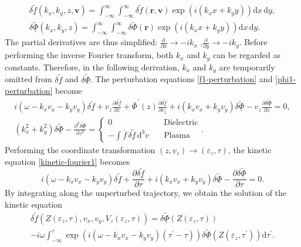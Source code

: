 \documentclass[superscriptaddress,preprint]{revtex4}  %
\renewcommand{\vec}{\mathbf}
\begin{document}
\begin{gather}
\delta\!\underline{\tilde{f}}(k_x,k_y,z,\vec{v})=\int_{-\infty}^{\infty} \int_{-\infty}^{\infty} \delta\!\tilde{f} (\vec{r},\vec{v}) \exp\left(i \left( k_x x+k_y y \right)\right) \mathrm{d}x \,\mathrm{d}y,\\
\delta \underline{\tilde{\Phi}}(k_x,k_y,z)=\int_{-\infty}^{\infty} \int_{-\infty}^{\infty} \delta\tilde{\Phi}(\vec{r}) \exp\left(i \left( k_x x+k_y y \right)\right) \mathrm{d}x \,\mathrm{d}y.
\end{gather}
The partial derivatives are thus simplified: $\displaystyle{\frac{\partial\,}{\partial x} \rightarrow -i k_x}$ ,$\displaystyle{\frac{\partial\,}{\partial y} \rightarrow -i k_y}$. Before performing the inverse Fourier transform, both $k_x$ and $k_y$ can be regarded as constants. Therefore, in the following derivation, $k_x$ and $k_y$ are temporarily omitted from $\delta\!\underline{\tilde{f}}$ and $\delta \underline{\tilde{\Phi}}$. The perturbation equations \eqref{f1-perturbation} and \eqref{phi1-perturbation} become
\begin{gather}
i(\omega - k_x v_x - k_y v_y) \delta\!\underline{\tilde{f}}+v_z \frac{\partial \delta\!\underline{\tilde{f}}}{\partial z}+ \bar\Phi^\prime(z)\frac{\partial \delta\!\underline{\tilde{f}}}{\partial v_z}+i(k_x v_x+k_y v_y)\delta\underline{\tilde{\Phi}} -v_z \frac{\partial \delta\underline{\tilde{\Phi}}}{\partial z}=0,
\label{kinetic-fourier1}\\
\left(k_x^2+k_y^2\right)\delta\underline{\tilde{\Phi}}-\frac{\partial^2 \delta\underline{\tilde{\Phi}}}{\partial z^2}=
\begin{cases}
0             &\text{Dielectric} \\
\displaystyle{-\int \bar f \,\delta\!\underline{\tilde{f}}\,\mathrm{d}^3 v}  \quad &\text{Plasma} 
\end{cases}.
\label{Poisson-fourier1}
\end{gather}
Performing the coordinate transformation $(z,v_z) \to (\varepsilon_z,\tau)$, the kinetic equation \eqref{kinetic-fourier1} becomes
\begin{equation}
i\left(\omega - k_x v_x - k_y v_y\right) \delta\!\underline{\tilde{f}}+\frac{\partial \delta\!\underline{\tilde{f}}}{\partial \tau} + i\left(k_x v_x+k_y v_y\right) \delta\underline{\tilde{\Phi}}-\frac{\partial \delta\underline{\tilde{\Phi}}}{\partial \tau}=0.
\end{equation}
By integrating along the unperturbed trajectory, we obtain the solution of the kinetic equation
\begin{equation}
\begin{gathered}
\delta\!\underline{\tilde{f}}\left(Z\left(\varepsilon_z,\tau\right),v_x,v_y,V_z\left(\varepsilon_z,\tau\right)\right)=\delta\underline{\tilde{\Phi}}(Z(\varepsilon_z,\tau))\\
-i\omega \int_{-\infty}^{\tau} \exp\left( i\left(\omega - k_x v_x - k_y v_y\right)\left(\tau^{\prime}-\tau\right) \right) \delta\underline{\tilde{\Phi}}\left(Z(\varepsilon_z,\tau^{\prime})\right) {\mathrm{d} \tau^{\prime}}.
\end{gathered}
\label{solution of kinetic equation}
\end{equation} 
\end{document}
